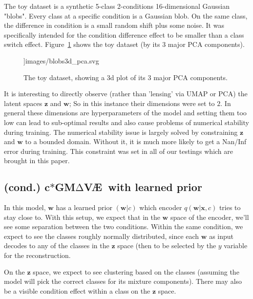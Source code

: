 \documentclass[11pt, a4paper]{report}
\theoremstyle{plain}
\theoremstyle{definition}
\theoremstyle{remark}
\newcommand{\x}{\mathbf{x}}
\newcommand{\z}{\mathbf{z}}
\newcommand{\w}{\mathbf{w}}
\newcommand{\gmvae}{c$\ast$GM$\mathrm{\Delta}$V\AE~}
\begin{document}
The toy dataset is a synthetic 5-class 2-conditions 16-dimensional Gaussian "blobs".
Every class at a specific condition is a Gaussian blob. 
On the same class, the difference in condition is a small random shift plus some
noise. It was specifically intended for the condition difference effect to be smaller than a
class switch effect.
Figure~\ref{fig:blobs_3d} shows the toy dataset (by its 3 major PCA components).

\begin{figure}[h]
\centering
\textwidth]{images/blobs3d_pca.svg}
\caption{The toy dataset, showing a 3d plot of its 3 major PCA components.
}
\label{fig:blobs_3d}
\end{figure}

It is interesting to directly observe (rather than 'lensing' via UMAP or PCA) the
latent spaces $\z$ and $\w$; So in this instance their dimensions were set to $2$.
In general these dimensions are hyperparameters of the model and setting them
too low can lead to sub-optimal results and also cause problems of numerical
stability during training.
The numerical stability issue is largely solved by constraining $\z$ and $\w$ to
a bounded domain. Without it, 
it is much more likely to get a Nan/Inf error during training.
This constraint was set in all of our testings which are brought
in this paper.

\subsection{(cond.) \gmvae with learned prior}

In this model, $\w$ has a learned prior $(\w | c)$ which encoder $q(\w | \x, c)$ 
tries to stay close to.
With this setup, we expect that in the $\w$ space of the 
encoder, we'll see some separation between the two conditions.
Within the same condition, we expect to see the classes roughly normally
distributed, since each $\w$ as input decodes to any of the classes in the $\z$
space (then to be selected by the $y$ variable for the reconstruction.

On the $\z$ space, we expect to see clustering based on the classes (assuming
the model will pick the correct classes for its mixture components).
There may also be a visible condition effect within a class on the $\z$ space.
\end{document}
